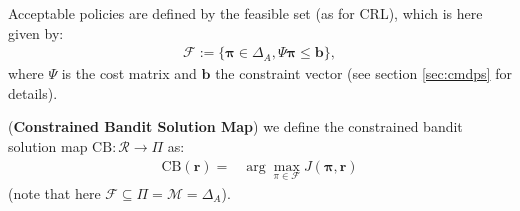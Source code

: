 Acceptable policies are defined by the feasible set (as for CRL), which is here given by:
\begin{align*}
    \mathcal{F} := \big\lbrace \bm{\pi} \in \Delta_A, \Psi \bm{\pi} \leq \bm{b} \big\rbrace,
\end{align*}
where $\Psi$ is the cost matrix and $\bm{b}$ the constraint vector (see section \ref{sec:cmdps} for details).

\begin{definition}
    (\textbf{Constrained Bandit Solution Map}) we define the constrained bandit solution map $\text{CB}:\mathcal{R} \rightarrow \Pi$ as:
    \begin{align*}
        \text{CB}(\bm{r}) = &\arg \max_{\pi\in \mathcal{F}}  J(\bm{\pi},\bm{r})
    \end{align*}
    (note that here $\mathcal{F} \subseteq \Pi = \mathcal{M} = \Delta_A$).
\end{definition}




